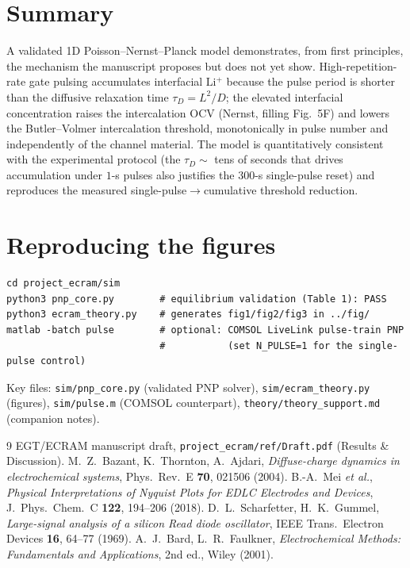 \documentclass[11pt,a4paper]{article}
\newcommand{\Lip}{\ensuremath{\mathrm{Li^{+}}}}
\begin{document}
\section{Summary}
A validated 1D Poisson--Nernst--Planck model demonstrates, from first principles,
the mechanism the manuscript proposes but does not yet show. High-repetition-rate
gate pulsing accumulates interfacial \Lip{} because the pulse period is shorter
than the diffusive relaxation time $\tau_D=L^2/D$; the elevated interfacial
concentration raises the intercalation OCV (Nernst, filling Fig.~5F) and lowers
the Butler--Volmer intercalation threshold, monotonically in pulse number and
independently of the channel material. The model is quantitatively consistent
with the experimental protocol (the $\tau_D\sim$ tens of seconds that drives
accumulation under $1$-s pulses also justifies the $300$-s single-pulse reset)
and reproduces the measured single-pulse$\to$cumulative threshold reduction.

\appendix
\section{Reproducing the figures}
\begin{verbatim}
cd project_ecram/sim
python3 pnp_core.py        # equilibrium validation (Table 1): PASS
python3 ecram_theory.py    # generates fig1/fig2/fig3 in ../fig/
matlab -batch pulse        # optional: COMSOL LiveLink pulse-train PNP
                           #           (set N_PULSE=1 for the single-pulse control)
\end{verbatim}
Key files: \texttt{sim/pnp\_core.py} (validated PNP solver),
\texttt{sim/ecram\_theory.py} (figures), \texttt{sim/pulse.m} (COMSOL
counterpart), \texttt{theory/theory\_support.md} (companion notes).

\begin{thebibliography}{9}
 EGT/ECRAM manuscript draft, \texttt{project\_ecram/ref/Draft.pdf}
(Results \& Discussion).
 M.~Z.~Bazant, K.~Thornton, A.~Ajdari,
\textit{Diffuse-charge dynamics in electrochemical systems}, Phys.\ Rev.\ E
\textbf{70}, 021506 (2004).
 B.-A.~Mei \textit{et al.},
\textit{Physical Interpretations of Nyquist Plots for EDLC Electrodes and
Devices}, J.\ Phys.\ Chem.\ C \textbf{122}, 194--206 (2018).
 D.~L.~Scharfetter, H.~K.~Gummel,
\textit{Large-signal analysis of a silicon Read diode oscillator}, IEEE Trans.\
Electron Devices \textbf{16}, 64--77 (1969).
 A.~J.~Bard, L.~R.~Faulkner, \textit{Electrochemical Methods:
Fundamentals and Applications}, 2nd ed., Wiley (2001).
\end{thebibliography}
\end{document}
